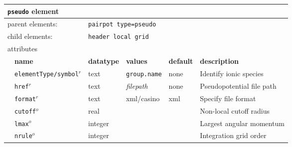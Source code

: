 \FloatBarrier
\begin{table}[h]
\begin{center}
\begin{tabularx}{\textwidth}{l l l l l l }
\hline
\multicolumn{6}{l}{\texttt{pseudo} element} \\
\hline
\multicolumn{2}{l}{parent elements:} & \multicolumn{4}{l}{\texttt{pairpot type=pseudo}}\\
\multicolumn{2}{l}{child  elements:} & \multicolumn{4}{l}{\texttt{header local grid}}\\
\multicolumn{2}{l}{attributes}  & \multicolumn{4}{l}{}\\
   &   \bfseries name     & \bfseries datatype & \bfseries values & \bfseries default   & \bfseries description \\
   & \texttt{elementType/symbol}$^r$&  text    &\texttt{group.name}& none               & Identify ionic species   \\
   & \texttt{href}$^r$    &  text              & \textit{filepath}& none                & Pseudopotential file path\\
   & \texttt{format}$^r$  &  text              & xml/casino       & xml                 & Specify file format\\
   & \texttt{cutoff}$^o$  &  real              &                  &                     & Non-local cutoff radius  \\
   & \texttt{lmax}$^o$    &  integer           &                  &                     & Largest angular momentum  \\
   & \texttt{nrule}$^o$   &  integer           &                  &                     & Integration grid order             \\
  \hline
\end{tabularx}
\end{center}
\end{table}
\FloatBarrier



